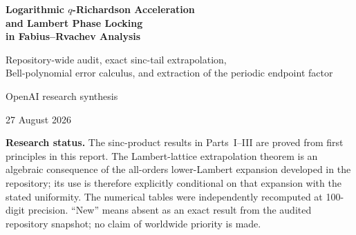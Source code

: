 \documentclass[11pt]{article}
\theoremstyle{definition}
\theoremstyle{remark}
\begin{document}
\hypersetup{pageanchor=false}

\begin{titlepage}
\centering
\vspace*{1.1cm}
{\Huge\bfseries Logarithmic $q$-Richardson Acceleration\\[0.25em]
and Lambert Phase Locking\\[0.4em]
in Fabius--Rvachev Analysis\par}
\vspace{0.8cm}
{\Large Repository-wide audit, exact sinc-tail extrapolation,\\
Bell-polynomial error calculus, and extraction of the periodic endpoint factor\par}
\vspace{1.2cm}
{\large OpenAI research synthesis\par}
\vspace{0.35cm}
{\large 27 August 2026\par}
\vfill
\begin{minipage}{0.88\textwidth}
\small
\textbf{Research status.} The sinc-product results in Parts~I--III are proved from first principles in this report. The Lambert-lattice extrapolation theorem is an algebraic consequence of the all-orders lower-Lambert expansion developed in the repository; its use is therefore explicitly conditional on that expansion with the stated uniformity. The numerical tables were independently recomputed at 100-digit precision. ``New'' means absent as an exact result from the audited repository snapshot; no claim of worldwide priority is made.
\end{minipage}
\vfill
\end{titlepage}
\clearpage
\hypersetup{pageanchor=true}
\end{document}
